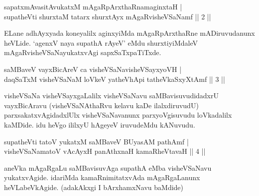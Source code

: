 \begin{shl}
sapatxmAvasitAvukatxM mAgaRpArxthaRnamaginxtaH | \\
supatheVti shurxtaM tatarx shurxtAyx mAgaRvisheVSaNamf \hfill|| 2 || 
\end{shl}

\begin{artha}
ELane adhAyxyada koneyalilx aginxyiMda mAgaRpArxthaRne mADiruvudanunx 
heVLide. `agenxV naya supathA rAyeV' eMdu shurxtiyiMdaleV mAgaRvisheVSaNayukatxvAgi sapxSaTxpaTiTxde.
\end{artha}


\begin{shl}
\footnotemark[1]saMBaveV vayxBicAreV ca visheVSaNavisheVSayxyoVH | \\
daqSaTxM visheVSaNaM loVkeV yatheVhApi tatheVkaSxyXtAmf \hfill|| 3 || 
\end{shl}

\begin{artha}
visheVSaNa visheVSayxgaLalilx visheVSaNavu saMBavisuvudidadxrU 
vayxBicAravu (visheVSaNAthaRvu kelavu kaDe ilalxdiruvudU) 
parxsakatxvAgidadxlUlx visheVSaNavanunx parxyoVgisuvudu loVkadalilx 
kaMDide. idu heVgo ililxyU hAgeyeV iruvudeMdu kANuvudu.
\end{artha}


\begin{shl}
supatheVti tatoV yukatxM saMBaveV BUyasAM pathAmf | \\
visheVSaNamatoV vAcAyxH panAthxnaH kamaRheVtavaH \hfill|| 4 || 
\end{shl}

\begin{artha}
aneVka mAgaRgaLu saMBavisuvAga supathA eMba visheVSaNavu yukatxvAgide. 
idariMda kamaRnimitatxvAda mAgaRgaLanunx heVLabeVkAgide. (adakAkxgi I 
bArxhamxNavu baMdide)
\end{artha}

